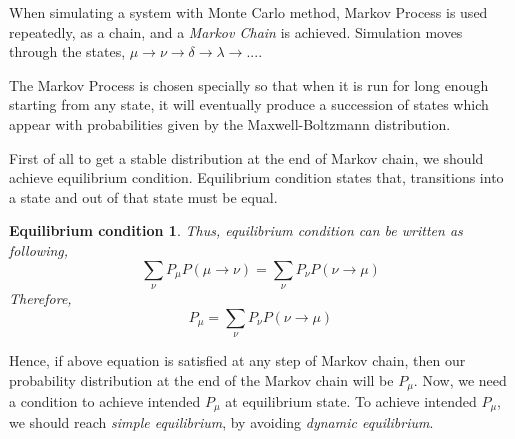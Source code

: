 \documentclass[12pt,fleqn]{report}
\begin{document}
When simulating a system with Monte Carlo method, Markov Process is used repeatedly, as a chain, and a \textit{Markov Chain} is achieved. Simulation moves through the states, $\mu \rightarrow \nu \rightarrow \delta \rightarrow \lambda \rightarrow ...$. 

The Markov Process is chosen specially so that when it is run for long enough starting from any state, it will eventually produce a succession of states which appear with probabilities given by the Maxwell-Boltzmann distribution. 

First of all to get a stable distribution at the end of Markov chain, we should achieve equilibrium condition. Equilibrium condition states that, transitions into a state and out of that state must be equal. 

\newtheorem*{equil}{Equilibrium condition}
\begin{equil}
Thus, equilibrium condition can be written as following,
$$\sum\limits_{\nu} P_\mu P(\mu \rightarrow \nu) = \sum\limits_{\nu} P_\nu P(\nu \rightarrow \mu) $$
Therefore, 
$$P_\mu  = \sum\limits_{\nu} P_\nu P(\nu \rightarrow \mu)$$
\end{equil}

Hence, if above equation is satisfied at any step of Markov chain, then our probability distribution at the end of the Markov chain will be $P_\mu$. Now, we need a condition to achieve intended $P_\mu$ at equilibrium state. To achieve intended $P_\mu$, we should reach \textit{simple equilibrium}, by avoiding \textit{dynamic equilibrium}. 

\end{document}
